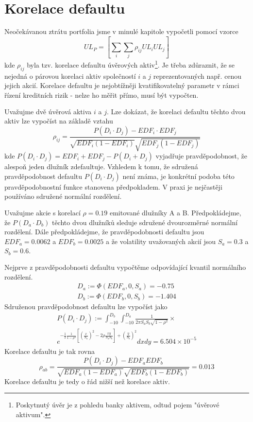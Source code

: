 \chapter{Korelace defaultu}

Neočekávanou ztrátu portfolia jsme v minulé kapitole vypočetli pomocí vzorce
\begin{equation*}
UL_P = \left[\sum_i \sum_j \rho_{ij} UL_i UL_j\right]
\end{equation*}
kde $\rho_{ij}$ byla tzv. korelace defaultu úvěrových aktiv\footnote{Poskytnutý úvěr je z pohledu banky aktivem, odtud pojem "úvěrové aktivum".}. Je třeba zdůraznit, že se nejedná o párovou korelaci aktiv společností $i$ a $j$ reprezentovaných např. cenou jejich akcií. Korelace defaultu je nejobtížněji kvatifikovatelný parametr v rámci řízení kreditních rizik - nelze ho měřit přímo, musí být vypočten.

Uvažujme dvě úvěrová aktiva $i$ a $j$. Lze dokázat, že korelaci defaultu těchto dvou aktiv lze vypočíst na základě vztahu
\begin{equation}
\rho_{ij} = \frac{P(D_i \cdot D_j) - EDF_i \cdot EDF_j}{\sqrt{EDF_i(1 - EDF_i)}\sqrt{EDF_j(1 - EDF_j)}}
\end{equation}
kde $P(D_i \cdot D_j) = EDF_i + EDF_j - P(D_i + D_j)$ vyjadřuje pravděpodobnost, že alespoň jeden dlužník zdefaultuje. Vzhledem k tomu, že sdružená pravděpodobnost defaultu $P(D_i \cdot D_j)$ není známa, je konkrétní podoba této pravděpodobnostní funkce stanovena předpokladem. V praxi je nejčastěji používáno sdružené normální rozdělení.

\begin{example}
Uvažujme akcie s korelací $\rho = 0.19$ emitované dlužníky A a B. Předpokládejme, že $P(D_a \cdot D_b)$ těchto dvou dlužníků sleduje sdružené dvourozměrné normální rozdělení. Dále předpokládejme, že pravděpodobnosti defaultu jsou $EDF_a = 0.0062$ a $EDF_b = 0.0025$ a že volatility uvažovaných akcií jsou $S_a = 0.3$ a $S_b = 0.6$.

Nejprve z pravděpodobnosti defaultu vypočtěme odpovídající kvantil normálního rozdělení.
\begin{align*}
D_a := \Phi(EDF_a, 0, S_a) = -0.75\\
D_b := \Phi(EDF_b, 0, S_b) = -1.404
\end{align*}
Sdruženou pravděpodobnost defaultu lze vypočíst jako
\begin{multline*}
P(D_i \cdot D_j) := \int_{-10}^{D_b} \int_{-10}^{D_a} \frac{1}{2 \pi S_a S_b \sqrt{1 - \rho^2}} \times\\
e^{-\frac{1}{2}\frac{1}{1 - \rho^2}\left[\left(\frac{x}{S_a}\right)^2 - 2\rho\frac{xy}{S_a S_b}\right] + \left(\frac{y}{S_b}\right)^2}dxdy = 6.504 \times 10^{-5}
\end{multline*}
Korelace defaultu je tak rovna
\begin{equation*}
\rho_{ab} = \frac{P(D_i \cdot D_j) - EDF_aEDF_b}{\sqrt{EDF_a(1 - EDF_a)}\sqrt{EDF_b(1 - EDF_b)}} = 0.013
\end{equation*}
Korelace defaultu je tedy o řád nižší než korelace aktiv.
\end{example}

